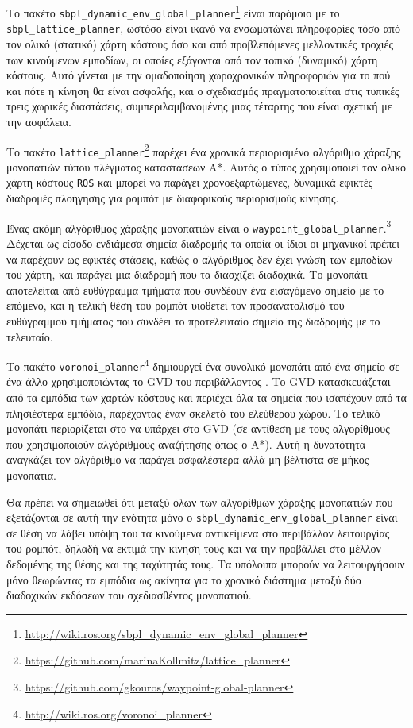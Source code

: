 Το πακέτο
\texttt{sbpl\_dynamic\_env\_global\_planner}\footnote{\url{http://wiki.ros.org/sbpl\_dynamic\_env\_global\_planner}\cite{Phillips2011}}
είναι παρόμοιο με το \texttt{sbpl\_lattice\_planner}, ωστόσο είναι ικανό να
ενσωματώνει πληροφορίες τόσο από τον ολικό (στατικό) χάρτη κόστους όσο και από
προβλεπόμενες μελλοντικές τροχιές των κινούμενων εμποδίων, οι οποίες εξάγονται
από τον τοπικό (δυναμικό) χάρτη κόστους. Αυτό γίνεται με την ομαδοποίηση
χωροχρονικών πληροφοριών για το πού και πότε η κίνηση θα είναι ασφαλής, και ο
σχεδιασμός πραγματοποιείται στις τυπικές τρεις χωρικές διαστάσεις,
συμπεριλαμβανομένης μιας τέταρτης που είναι σχετική με την ασφάλεια.

Το πακέτο
\texttt{lattice\_planner}\footnote{\url{https://github.com/marinaKollmitz/lattice\_planner}}
παρέχει ένα χρονικά περιορισμένο αλγόριθμο χάραξης μονοπατιών τύπου
πλέγματος καταστάσεων A*. Αυτός ο τύπος χρησιμοποιεί τον ολικό χάρτη κόστους
\texttt{ROS} και μπορεί να παράγει χρονοεξαρτώμενες, δυναμικά εφικτές διαδρομές
πλοήγησης για ρομπότ με διαφορικούς περιορισμούς κίνησης.

Ένας ακόμη αλγόριθμος χάραξης μονοπατιών είναι ο
\texttt{waypoint\_global\_planner}.\footnote{\url{https://github.com/gkouros/waypoint-global-planner}}
Δέχεται ως είσοδο ενδιάμεσα σημεία διαδρομής τα οποία οι ίδιοι οι μηχανικοί
πρέπει να παρέχουν ως εφικτές στάσεις, καθώς ο αλγόριθμος δεν έχει γνώση των
εμποδίων του χάρτη, και παράγει μια διαδρομή που τα διασχίζει διαδοχικά. Το
μονοπάτι αποτελείται από ευθύγραμμα τμήματα που συνδέουν ένα εισαγόμενο σημείο
με το επόμενο, και η τελική θέση του ρομπότ υιοθετεί τον προσανατολισμό του
ευθύγραμμου τμήματος που συνδέει το προτελευταίο σημείο της
διαδρομής με το τελευταίο.


Το πακέτο
\texttt{voronoi\_planner}\footnote{\url{http://wiki.ros.org/voronoi\_planner}}
δημιουργεί ένα συνολικό μονοπάτι από ένα σημείο σε ένα άλλο χρησιμοποιώντας το
GVD του περιβάλλοντος \cite{Bhattacharya2007}. Το GVD κατασκευάζεται από τα
εμπόδια των χαρτών κόστους και περιέχει όλα τα σημεία που ισαπέχουν από τα
πλησιέστερα εμπόδια, παρέχοντας έναν σκελετό του ελεύθερου χώρου. Το τελικό
μονοπάτι περιορίζεται στο να υπάρχει στο GVD (σε αντίθεση με τους αλγορίθμους
που χρησιμοποιούν αλγόριθμους αναζήτησης όπως ο A*). Αυτή η δυνατότητα
αναγκάζει τον αλγόριθμο να παράγει ασφαλέστερα αλλά μη βέλτιστα σε μήκος
μονοπάτια.

Θα πρέπει να σημειωθεί ότι μεταξύ όλων των αλγορίθμων χάραξης μονοπατιών που
εξετάζονται σε αυτή την ενότητα μόνο ο
\texttt{sbpl\_dynamic\_env\_global\_planner} είναι σε θέση να λάβει υπόψη του
τα κινούμενα αντικείμενα στο περιβάλλον λειτουργίας του ρομπότ, δηλαδή να
εκτιμά την κίνηση τους και να την προβάλλει στο μέλλον δεδομένης της θέσης και
της ταχύτητάς τους. Τα υπόλοιπα μπορούν να λειτουργήσουν μόνο θεωρώντας τα
εμπόδια ως ακίνητα για το χρονικό διάστημα μεταξύ δύο διαδοχικών εκδόσεων του
σχεδιασθέντος μονοπατιού.

